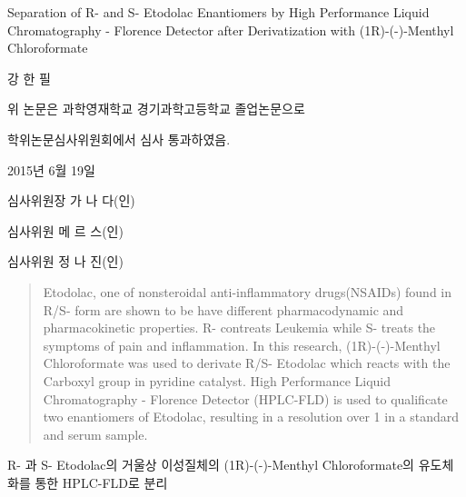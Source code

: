 \documentclass[12pt]{article} %
\begin{document}
\begin{center}
	\LARGE Separation of R- and S- Etodolac Enantiomers by High Performance Liquid Chromatography - Florence Detector after Derivatization with (1R)-(-)-Menthyl Chloroformate
	
	\vskip12mm
	\Large
	강 한 필
	
	\vskip12mm
	
	위 논문은 과학영재학교 경기과학고등학교 졸업논문으로
	
	학위논문심사위원회에서 심사 통과하였음.
\end{center}
\begin{flushright}	
	\Large
	\vskip48mm
	
	2015년 6월 19일
	
	\bigskip
	
	심사위원장 가 나 다(인)
	
	심사위원 메 르 스(인)
	
	심사위원 정 나 진(인)
\end{flushright}
\pagebreak
	




\setcounter{page}{1}

\maketitle

\begin{abstract}
Etodolac, one of nonsteroidal anti-inflammatory drugs(NSAIDs) found in R/S- form are shown to be have different pharmacodynamic and pharmacokinetic properties. R- contreats Leukemia while S- treats the symptoms of pain and inflammation. In this research, (1R)-(-)-Menthyl Chloroformate was used to derivate R/S- Etodolac which reacts with the Carboxyl group in pyridine catalyst. High Performance Liquid Chromatography - Florence Detector (HPLC-FLD) is used to qualificate two enantiomers of Etodolac, resulting in a resolution over 1 in a standard and serum sample.  
\end{abstract}

\newpage

\begin{center}

	\vskip24mm
	
	\LARGE R- 과 S- Etodolac의 거울상 이성질체의 (1R)-(-)-Menthyl Chloroformate의 유도체화를 통한 HPLC-FLD로 분리
	
	\bigskip

\end{center}
\end{document}
